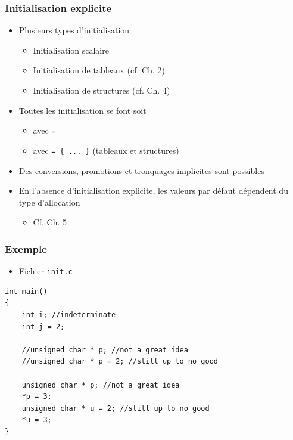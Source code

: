 \begin{frame}
\frametitle{Initialisation explicite}
\begin{itemize}[<+->]
\item Plusieurs types d'initialisation
	\begin{itemize}
	\item Initialisation scalaire
	\item Initialisation de tableaux (cf. Ch. 2)
	\item Initialisation de structures (cf. Ch. 4)
	\end{itemize}
\item Toutes les initialisation se font soit
	\begin{itemize}
	\item avec \texttt{=}
	\item avec \texttt{= \{ ... \}} (tableaux et structures)
	\end{itemize}
\item Des conversions, promotions et tronquages implicites sont possibles
\item En l'absence d'initialisation explicite, les valeurs par défaut dépendent du type d'allocation
	\begin{itemize}
	\item Cf. Ch. 5
	\end{itemize}
\end{itemize}
\end{frame}
%
\begin{frame}[containsverbatim]
\frametitle{Exemple}
\begin{itemize}
\item Fichier \texttt{init.c}
\end{itemize}
\begin{lstlisting}
int main()
{
    int i; //indeterminate
    int j = 2; 
	
    //unsigned char * p; //not a great idea
    //unsigned char * p = 2; //still up to no good

    unsigned char * p; //not a great idea
    *p = 3; 
    unsigned char * u = 2; //still up to no good
    *u = 3;
}
\end{lstlisting}
\end{frame}


